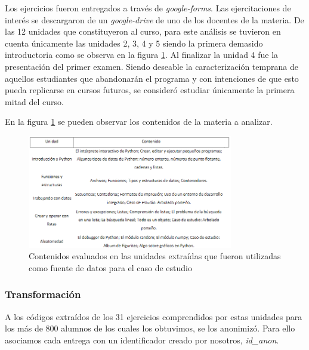 \documentclass[11pt,a4paper,twoside,openany]{tesis}
\begin{document}
Los ejercicios fueron entregados a través de \emph{google-forms}. Las ejercitaciones de interés se descargaron de un \emph{google-drive} de uno de los docentes de la materia. De las 12 unidades que constituyeron al curso, para este análisis se tuvieron en cuenta únicamente las unidades 2, 3, 4 y 5 siendo la primera demasido introductoria como se observa en la figura \ref{contenidos}. Al finalizar la unidad 4 fue la presentación del primer examen. Siendo deseable la caracterización temprana de aquellos estudiantes que abandonarán el programa y con intenciones de que esto pueda replicarse en cursos futuros, se consideró estudiar únicamente la primera mitad del curso. 

En la figura  \ref{contenidos} se pueden observar  los contenidos de la materia a analizar.

\begin{figure}[H]
    \centering
    \includegraphics[width=0.8\textwidth]{imagenes/modulos-curso.PNG}
    \caption{Contenidos evaluados en las unidades extraídas que fueron utilizadas como fuente de datos para el caso de estudio ~\cite{unsam2020}}
    \label{contenidos}
\end{figure}



\subsubsection{Transformación}\label{sec:normalizacion}  \textbf{ }

A los códigos extraídos de los 31 ejercicios comprendidos por estas unidades para los más de 800 alumnos de los cuales los obtuvimos, se los anonimizó. Para ello asociamos cada entrega con un identificador creado por nosotros, \emph{id\_anon}.
\end{document}
